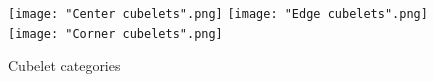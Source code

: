 \documentclass[final, letterpaper, 10 pt, conference, twocolumn]{IEEEtran}
\begin{document}
\begin{figure}[!hb]
\begin{center}
  \texttt{[image: "Center cubelets".png]}
  \label{fig:center_cubelets}
\endminipage\hfill
{}
  \texttt{[image: "Edge cubelets".png]}
  \label{fig:edge_cubelets}
\endminipage\hfill
{}%
  \texttt{[image: "Corner cubelets".png]}
  \label{fig:corner_cubelets}
\endminipage
\caption{Cubelet categories}
\label{fig:cubelet_categories}
\end{center}
\end{figure}
\end{document}
